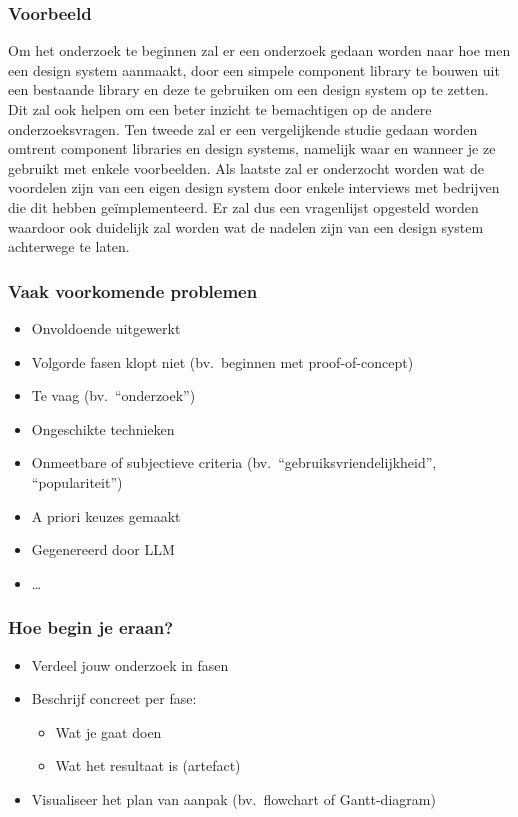 \documentclass[aspectratio=169]{beamer}
\begin{document}
\begin{frame}
  \frametitle{Voorbeeld}

  \small

  Om het onderzoek te beginnen zal er een onderzoek gedaan worden naar hoe men een design system aanmaakt, door een simpele component library te bouwen uit een bestaande library en deze te gebruiken om een design system op te zetten. Dit zal ook helpen om een beter inzicht te bemachtigen op de andere onderzoeksvragen. Ten tweede zal er een vergelijkende studie gedaan worden omtrent component libraries en design systems, namelijk waar en wanneer je ze gebruikt met enkele voorbeelden. Als laatste zal er onderzocht worden wat de voordelen zijn van een eigen design system door enkele interviews met bedrijven die dit hebben geïmplementeerd. Er zal dus een vragenlijst opgesteld worden waardoor ook duidelijk zal worden wat de nadelen zijn van een design system achterwege te laten.

\end{frame}

\begin{frame}
  \frametitle{Vaak voorkomende problemen}

  \begin{itemize}
    \item Onvoldoende uitgewerkt
    \item Volgorde fasen klopt niet (bv.\ beginnen met proof-of-concept)
    \item Te vaag (bv.\ ``onderzoek'')
    \item Ongeschikte technieken
    \item Onmeetbare of subjectieve criteria (bv.\ ``gebruiksvriendelijkheid'', ``populariteit'')
    \item A priori keuzes gemaakt
    \item Gegenereerd door LLM
    \item \ldots
  \end{itemize}

\end{frame}

\begin{frame}
  \frametitle{Hoe begin je eraan?}

  \begin{itemize}
    \item Verdeel jouw onderzoek in fasen
    \item Beschrijf concreet per fase:
          \begin{itemize}
            \item Wat je gaat doen
            \item Wat het resultaat is (artefact)
          \end{itemize}
    \item Visualiseer het plan van aanpak (bv.\ flowchart of Gantt-diagram)
  \end{itemize}
\end{frame}
\end{document}
